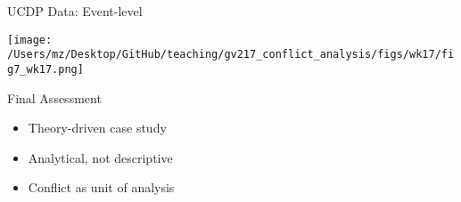\documentclass[handout]{beamer}
\begin{document}
\begin{frame}{UCDP Data: Event-level}
    \pause
    \begin{center}
        \texttt{[image: /Users/mz/Desktop/GitHub/teaching/gv217\_conflict\_analysis/figs/wk17/fig7\_wk17.png]}
    \end{center}
\end{frame}

\begin{frame}{Final Assessment}
    \begin{itemize}
        \pause\item Theory-driven case study
        \pause\item Analytical, not descriptive
        \pause\item Conflict as unit of analysis
    \end{itemize}
\end{frame}
\end{document}
